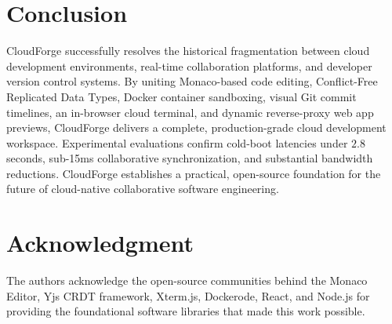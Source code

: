 \documentclass[conference]{IEEEtran}
\begin{document}
\section{Conclusion}

CloudForge successfully resolves the historical fragmentation between cloud development environments, real-time collaboration platforms, and developer version control systems. By uniting Monaco-based code editing, Conflict-Free Replicated Data Types, Docker container sandboxing, visual Git commit timelines, an in-browser cloud terminal, and dynamic reverse-proxy web app previews, CloudForge delivers a complete, production-grade cloud development workspace. Experimental evaluations confirm cold-boot latencies under $2.8$ seconds, sub-15ms collaborative synchronization, and substantial bandwidth reductions. CloudForge establishes a practical, open-source foundation for the future of cloud-native collaborative software engineering.

\section*{Acknowledgment}
The authors acknowledge the open-source communities behind the Monaco Editor, Yjs CRDT framework, Xterm.js, Dockerode, React, and Node.js for providing the foundational software libraries that made this work possible.
\end{document}
